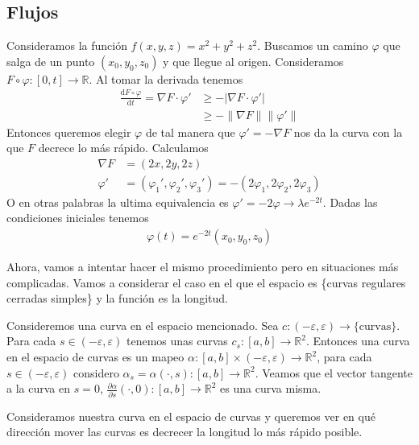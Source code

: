 \documentclass{article}
\theoremstyle{mytheoremstyle}
\theoremstyle{mytheoremstyle}
\theoremstyle{myproblemstyle}
\begin{document}
\subsection{Flujos}
Consideramos la función $f(x,y,z)=x^2+y^2+z^2$. Buscamos un camino $\varphi$ que salga de un punto $(x_0,y_0,z_0)$ y que llegue al origen. Consideramos $F\circ \varphi : [0,t] \to \mathbb{R}$. Al tomar la derivada tenemos 
\begin{align}
  \frac{\mathrm d F\circ \varphi }{\mathrm d t} =  \nabla F \cdot \varphi' &\geq -|\nabla F \cdot \varphi'| \\
                                                                           & \geq -\|\nabla F\| \|\varphi'\| 
\end{align}
Entonces queremos elegir $\varphi$ de tal manera que $\varphi'=-\nabla F$ nos da la curva con la que $F$ decrece lo más rápido. Calculamos 
\begin{align}
  \nabla F &= (2x, 2y,2z) \\
  \varphi' &= (\varphi_1',\varphi_2',\varphi_3')=-(2\varphi_1 ,2\varphi_2 ,2\varphi_3) 
\end{align}
O en otras palabras la ultima equivalencia es $\varphi' = - 2 \varphi \longrightarrow \lambda e^{-2 t}$. Dadas las condiciones iniciales tenemos 
\begin{align}
  \varphi(t)=e^{-2t}(x_0,y_0,z_0)
\end{align}

Ahora, vamos a intentar hacer el mismo procedimiento pero en situaciones más complicadas. Vamos a considerar el caso en el que el espacio es \{curvas regulares cerradas simples\} y la función es la longitud.

Consideremos una curva en el espacio mencionado. Sea $c: (-\varepsilon , \varepsilon ) \to \{\text{curvas}\}$. Para cada $s\in (-\varepsilon,\varepsilon)$ tenemos unas curvas $c_s: [a,b]\to \mathbb{R}^2$. Entonces una curva en el espacio de curvas es un mapeo $\alpha: [a,b]\times (-\varepsilon,\varepsilon)\to \mathbb{R}^2$, para cada $s\in (-\varepsilon,\varepsilon)$ considero $\alpha_s=\alpha(\cdot,s):[a,b]\to \mathbb{R}^2$.  Veamos que el vector tangente a la curva en $s=0$, $\frac{\partial\alpha}{\partial s}(\cdot, 0):[a,b] \to \mathbb{R}^2$ es una curva misma.

Consideramos nuestra curva en el espacio de curvas y queremos ver en qué dirección mover las curvas es decrecer la longitud lo más rápido posible.
\end{document}
